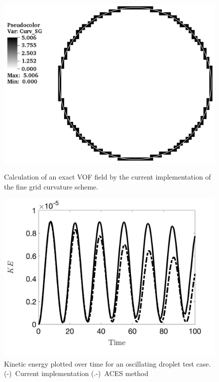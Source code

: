 \begin{figure}[htbp]
	\centering
	\begin{minipage}{.45\textwidth}
		\centering
		\includegraphics[width=1.0\linewidth]{figs/curvCalc.png}
		\caption{Calculation of an exact VOF field by the current implementation of the fine grid curvature scheme.}
		\label{fig:fgVelCurv}
	\end{minipage}%
	\hfill
	\begin{minipage}{0.45\textwidth}
		\centering
		\includegraphics[width=1.0\linewidth]{figs/current_KEplot.png}
		\caption{Kinetic energy plotted over time for an oscillating droplet test case. (-)~Current implementation (.-)~ACES method}
		\label{fig:fgVelKE}
	\end{minipage}
\end{figure}

